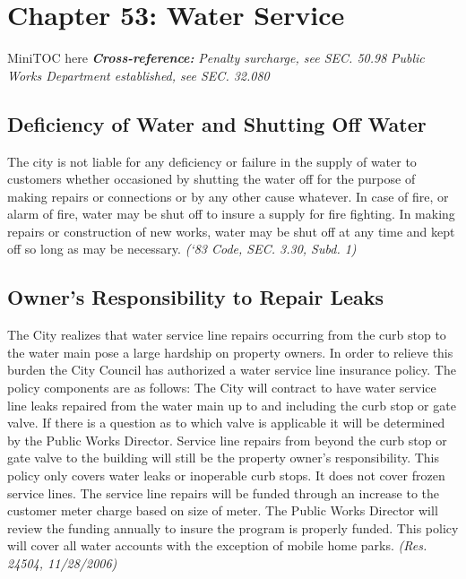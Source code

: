 %
\chapter*{Chapter 53: \newline
	Water Service}

MiniTOC here\newline
\textbf{\emph{{Cross-reference:}}}\newline
\emph{Penalty surcharge, see SEC. 50.98}\newline
\emph{Public Works Department established, see SEC. 32.080}
\pagebreak

\section{Deficiency of Water and Shutting Off Water}
The city is not liable for any deficiency or failure in the supply of water to customers whether occasioned by shutting the water off for the purpose of making repairs or connections or by any other cause whatever.  In case of fire, or alarm of fire, water may be shut off to insure a supply for fire fighting.  In making repairs or construction of new works, water may be shut off at any time and kept off so long as may be necessary.\newline
\emph{(‘83 Code, SEC. 3.30, Subd. 1)}
\section{Owner's Responsibility to Repair Leaks}
The City realizes that water service line repairs occurring from the curb stop to the water main pose a large hardship on property owners.  In order to relieve this burden the City Council has authorized a water service line insurance policy.  The policy components are as follows:  The City will contract to have water service line leaks repaired from the water main up to and including the curb stop or gate valve.  If there is a question as to which valve is applicable it will be determined by the Public Works Director. Service line repairs from beyond the curb stop or gate valve to the building will still be the property owner’s responsibility.  This policy only covers water leaks or inoperable curb stops.  It does not cover frozen service lines.  The service line repairs will be funded through an increase to the customer meter charge based on size of meter. The Public Works Director will review the funding annually to insure the program is properly funded.  This policy will cover all water accounts with the exception of mobile home parks.\newline
\emph{(Res. 24504, 11/28/2006)}
